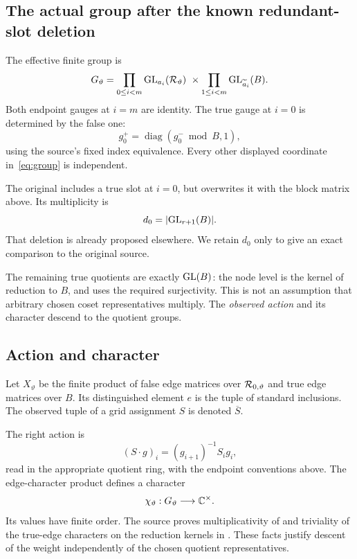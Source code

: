 \subsection{The actual group after the known redundant-slot deletion}

The effective finite group is
\begin{equation}\label{eq:group}
 G_\vartheta=
 \prod_{0\leq i<m}\operatorname{GL}_{a_i}(\mathcal R_\vartheta)
 \ \times\prod_{1\leq i<m}\operatorname{GL}_{\widetilde a_i}(B).
\end{equation}
Both endpoint gauges at $i=m$ are identity. The true gauge at $i=0$ is determined by the false one:
\[
 g_0^+=\operatorname{diag}(g_0^-\bmod B,1),
\]
using the source's fixed index equivalence. Every other displayed coordinate in~\eqref{eq:group} is independent.

The original  includes a true slot at $i=0$, but  overwrites it with the block matrix above. Its multiplicity is
\begin{equation}\label{eq:d0}
 d_0=\lvert \operatorname{GL}_{r+1}(B)\rvert.
\end{equation}
That deletion is already proposed elsewhere. We retain $d_0$ only to give an exact comparison to the original source.

The remaining true quotients are exactly $\operatorname{GL}(B)$: the node level is the kernel of reduction to $B$, and  uses the required surjectivity. This is not an assumption that arbitrary chosen coset representatives multiply. The \emph{observed action} and its character descend to the quotient groups.

\subsection{Action and character}

Let $X_\vartheta$ be the finite product of false edge matrices over $\mathcal R_{0,\vartheta}$ and true edge matrices over $B$. Its distinguished element $e$ is the tuple of standard inclusions. The observed tuple of a grid assignment $S$ is denoted $\overline S$.

The right action is
\begin{equation}\label{eq:action}
 (S\cdot g)_i=(g_{i+1})^{-1}S_i g_i,
\end{equation}
read in the appropriate quotient ring, with the endpoint conventions above. The edge-character product defines a character
\[
 \chi_\vartheta:G_\vartheta\longrightarrow\mathbb C^\times.
\]
Its values have finite order. The source proves multiplicativity of  and triviality of the true-edge characters on the reduction kernels in . These facts justify descent of the weight independently of the chosen quotient representatives.

